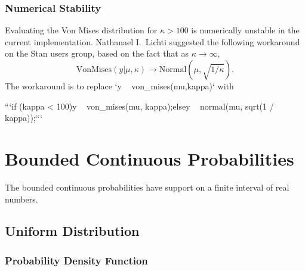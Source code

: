 \begin{description}
{\begin{description}
\begin{description}    \end{description}


\begin{description}    \end{description}


\subsection{Numerical Stability}


Evaluating the Von Mises distribution for $\kappa > 100$ is numerically unstable in the current implementation.  Nathanael I.\ Lichti suggested the following workaround on the Stan users group, based on the fact that as $\kappa \rightarrow \infty$, \[ \text{VonMises}(y|\mu,\kappa) \rightarrow \text{Normal}(\mu, \sqrt{1 / \kappa}). \] The workaround is to replace `y ~ von_mises(mu,kappa)` with


```\n if (kappa < 100)\n   y ~ von_mises(mu, kappa);\n else\n   y ~ normal(mu, sqrt(1 / kappa));\n ```


\chapter{Bounded Continuous Probabilities}


The bounded continuous probabilities have support on a finite interval of real numbers.


\section{Uniform Distribution}


\subsection{Probability Density Function}



\end{description}}
\end{description}
